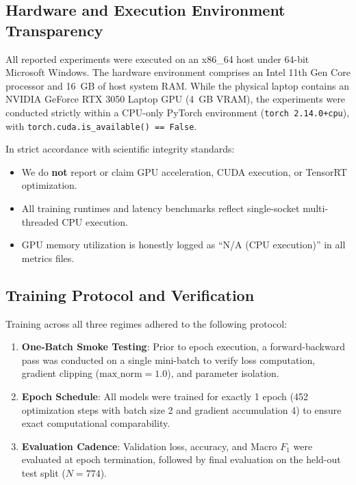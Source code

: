 \documentclass[conference]{IEEEtran}
\begin{document}
\subsection{Hardware and Execution Environment Transparency}
All reported experiments were executed on an x86\_64 host under 64-bit Microsoft Windows. The hardware environment comprises an Intel 11th Gen Core processor and 16~GB of host system RAM. While the physical laptop contains an NVIDIA GeForce RTX 3050 Laptop GPU (4~GB VRAM), the experiments were conducted strictly within a CPU-only PyTorch environment (\texttt{torch 2.14.0+cpu}), with \texttt{torch.cuda.is\_available() == False}.

In strict accordance with scientific integrity standards:
\begin{itemize}
    \item We do \textbf{not} report or claim GPU acceleration, CUDA execution, or TensorRT optimization.
    \item All training runtimes and latency benchmarks reflect single-socket multi-threaded CPU execution.
    \item GPU memory utilization is honestly logged as ``N/A (CPU execution)'' in all metrics files.
\end{itemize}

\subsection{Training Protocol and Verification}
Training across all three regimes adhered to the following protocol:
\begin{enumerate}
    \item \textbf{One-Batch Smoke Testing}: Prior to epoch execution, a forward-backward pass was conducted on a single mini-batch to verify loss computation, gradient clipping ($\text{max\_norm}=1.0$), and parameter isolation.
    \item \textbf{Epoch Schedule}: All models were trained for exactly 1 epoch (452 optimization steps with batch size 2 and gradient accumulation 4) to ensure exact computational comparability.
    \item \textbf{Evaluation Cadence}: Validation loss, accuracy, and Macro $F_1$ were evaluated at epoch termination, followed by final evaluation on the held-out test split ($N=774$).
\end{enumerate}

\end{document}
